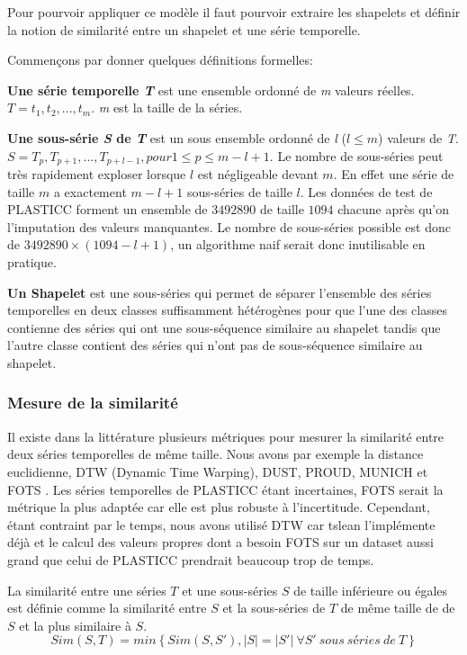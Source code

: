 Pour pourvoir appliquer ce modèle il faut pourvoir extraire les shapelets et définir la notion de similarité entre un shapelet et une série temporelle.

Commençons par donner quelques définitions formelles:

\textbf{Une série temporelle \textit{T}} est une ensemble ordonné de \textit{m} valeurs réelles. $ T = t_1, t_2,...,t_m $. \textit{m} est la taille de la séries.

\textbf{Une sous-série \textit{S} de \textit{T}} est un sous ensemble ordonné de \textit{l} ($ l \leq m $) valeurs de \textit{T}. $ S = T_p, T_{p+1},..., T_{p+l-1}, pour 1 \leq p \leq m-l+1 $. Le nombre de sous-séries peut très rapidement exploser lorsque $l$ est négligeable devant $m$. En effet une série de taille $m$ a exactement $ m-l+1 $ sous-séries de taille $l$. Les données de test de PLASTICC forment un ensemble de $ 3492890 $ de taille $1094$ chacune après qu'on l'imputation des valeurs manquantes. Le nombre de sous-séries possible est donc de $ 3492890 \times (1094 - l + 1)$, un algorithme naif serait donc inutilisable en pratique.

    \textbf{Un Shapelet} est une sous-séries qui permet de séparer l'ensemble des séries temporelles en deux classes suffisamment hétérogènes pour que l'une des classes contienne des séries qui ont une sous-séquence similaire au shapelet tandis que l'autre classe contient des séries qui n'ont pas de sous-séquence similaire au shapelet\cite{fotso2018frobenius}. 

\subsubsection{Mesure de la similarité}
Il existe dans la littérature plusieurs métriques pour mesurer la similarité entre deux séries temporelles de même taille. Nous avons par exemple la distance euclidienne, DTW (Dynamic Time Warping), DUST, PROUD, MUNICH et FOTS \cite{fotso2018frobenius}. Les séries temporelles de PLASTICC étant incertaines, FOTS serait la métrique la plus adaptée car elle est plus robuste à l'incertitude. Cependant, étant contraint par le temps, nous avons utilisé DTW car tslean l'implémente déjà et le calcul des valeurs propres dont a besoin FOTS sur un dataset aussi grand que celui de PLASTICC prendrait beaucoup trop de temps.

La similarité entre une séries $ T $ et une sous-séries $ S $ de taille inférieure ou égales est définie comme la similarité entre $ S $ et la sous-séries de $ T $ de même taille de de $ S $ et la plus similaire à $ S $. 
$$
Sim(S, T) = min \left \{ Sim(S, S'), |S|=|S'| \:  \forall S'\: sous \: séries \: de \: T \right \}
$$

